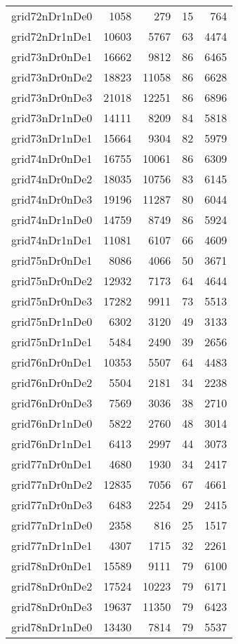 \begin{longtable}{lrrrr}
grid72nDr1nDe0 & 1058 & 279 & 15 & 764 \\
grid72nDr1nDe1 & 10603 & 5767 & 63 & 4474 \\
grid73nDr0nDe1 & 16662 & 9812 & 86 & 6465 \\
grid73nDr0nDe2 & 18823 & 11058 & 86 & 6628 \\
grid73nDr0nDe3 & 21018 & 12251 & 86 & 6896 \\
grid73nDr1nDe0 & 14111 & 8209 & 84 & 5818 \\
grid73nDr1nDe1 & 15664 & 9304 & 82 & 5979 \\
grid74nDr0nDe1 & 16755 & 10061 & 86 & 6309 \\
grid74nDr0nDe2 & 18035 & 10756 & 83 & 6145 \\
grid74nDr0nDe3 & 19196 & 11287 & 80 & 6044 \\
grid74nDr1nDe0 & 14759 & 8749 & 86 & 5924 \\
grid74nDr1nDe1 & 11081 & 6107 & 66 & 4609 \\
grid75nDr0nDe1 & 8086 & 4066 & 50 & 3671 \\
grid75nDr0nDe2 & 12932 & 7173 & 64 & 4644 \\
grid75nDr0nDe3 & 17282 & 9911 & 73 & 5513 \\
grid75nDr1nDe0 & 6302 & 3120 & 49 & 3133 \\
grid75nDr1nDe1 & 5484 & 2490 & 39 & 2656 \\
grid76nDr0nDe1 & 10353 & 5507 & 64 & 4483 \\
grid76nDr0nDe2 & 5504 & 2181 & 34 & 2238 \\
grid76nDr0nDe3 & 7569 & 3036 & 38 & 2710 \\
grid76nDr1nDe0 & 5822 & 2760 & 48 & 3014 \\
grid76nDr1nDe1 & 6413 & 2997 & 44 & 3073 \\
grid77nDr0nDe1 & 4680 & 1930 & 34 & 2417 \\
grid77nDr0nDe2 & 12835 & 7056 & 67 & 4661 \\
grid77nDr0nDe3 & 6483 & 2254 & 29 & 2415 \\
grid77nDr1nDe0 & 2358 & 816 & 25 & 1517 \\
grid77nDr1nDe1 & 4307 & 1715 & 32 & 2261 \\
grid78nDr0nDe1 & 15589 & 9111 & 79 & 6100 \\
grid78nDr0nDe2 & 17524 & 10223 & 79 & 6171 \\
grid78nDr0nDe3 & 19637 & 11350 & 79 & 6423 \\
grid78nDr1nDe0 & 13430 & 7814 & 79 & 5537 \\

\end{longtable}
